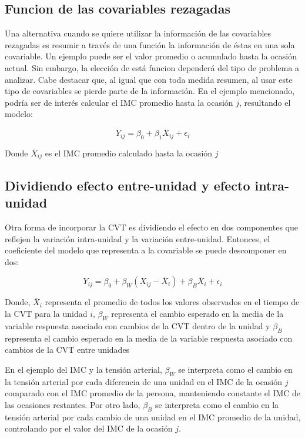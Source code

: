 \documentclass[spanish]{article}
\numberwithin{figure}{subsection}
\numberwithin{equation}{subsection}
\numberwithin{table}{subsection}
\begin{document}
\subsection{Funcion de las covariables rezagadas}

Una alternativa cuando se quiere utilizar la información de las covariables
rezagadas es resumir a través de una función la información de éstas en una sola
covariable. Un ejemplo puede ser el valor promedio o acumulado hasta la ocasión
actual. Sin embargo, la elección de está funcion dependerá del tipo de problema
a analizar. Cabe destacar que, al igual que con toda medida resumen, al usar
este tipo de covariables se pierde parte de la información. En el ejemplo
mencionado, podría ser de interés calcular el IMC promedio hasta la ocasión $j$,
resultando el modelo:

\[ Y_{ij} = \beta_0 + \beta_1 \overline{X}_{ij} + \epsilon_{i} \]

Donde $\overline{X}_{ij}$ es el IMC promedio calculado hasta la ocasión $j$

\subsection{Dividiendo efecto entre-unidad y efecto intra-unidad}
\label{Dividiendo efecto entre-unidad y efecto intra-unidad}

Otra forma de incorporar la CVT es dividiendo el efecto en dos componentes que
reflejen la variación intra-unidad y la variación entre-unidad. Entonces, el
coeficiente del modelo que representa a la covariable se puede descomponer en
dos:

\[ Y_{ij} = \beta_0 + \beta_W (X_{ij} - \overline{X}_i) + \beta_B \overline{X}_i + \epsilon_{i} \]

Donde, $\overline{X}_i$ representa el promedio de todos los valores observados
en el tiempo de la CVT para la unidad $i$, $\beta_W$ representa el cambio
esperado en la media de la variable respuesta asociado con cambios de la CVT
dentro de la unidad y $\beta_B$ representa el cambio esperado en la media de
la variable respuesta asociado con cambios de la CVT entre unidades

En el ejemplo del IMC y la tensión arterial, $\beta_W$ se interpreta como el
cambio en la tensión arterial por cada diferencia de una unidad en el IMC de la
ocasión $j$ comparado con el IMC promedio de la persona, manteniendo constante
el IMC de las ocasiones restantes. Por otro lado, $\beta_B$ se interpreta como
el cambio en la tensión arterial por cada cambio de una unidad en el IMC
promedio de la unidad, controlando por el valor del IMC de la ocasión $j$.
\end{document}
